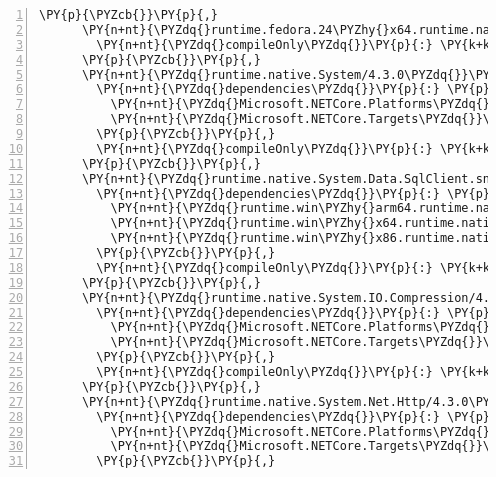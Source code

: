 \begin{Verbatim}[commandchars=\\\{\},numbers=left,firstnumber=1,stepnumber=1,numberblanklines=0]
      \PY{p}{\PYZcb{}}\PY{p}{,}
      \PY{n+nt}{\PYZdq{}runtime.fedora.24\PYZhy{}x64.runtime.native.System.Security.Cryptography.OpenSsl/4.3.0\PYZdq{}}\PY{p}{:} \PY{p}{\PYZob{}}
        \PY{n+nt}{\PYZdq{}compileOnly\PYZdq{}}\PY{p}{:} \PY{k+kc}{true}
      \PY{p}{\PYZcb{}}\PY{p}{,}
      \PY{n+nt}{\PYZdq{}runtime.native.System/4.3.0\PYZdq{}}\PY{p}{:} \PY{p}{\PYZob{}}
        \PY{n+nt}{\PYZdq{}dependencies\PYZdq{}}\PY{p}{:} \PY{p}{\PYZob{}}
          \PY{n+nt}{\PYZdq{}Microsoft.NETCore.Platforms\PYZdq{}}\PY{p}{:} \PY{l+s+s2}{\PYZdq{}2.1.0\PYZhy{}rc1\PYZdq{}}\PY{p}{,}
          \PY{n+nt}{\PYZdq{}Microsoft.NETCore.Targets\PYZdq{}}\PY{p}{:} \PY{l+s+s2}{\PYZdq{}2.1.0\PYZhy{}rc1\PYZdq{}}
        \PY{p}{\PYZcb{}}\PY{p}{,}
        \PY{n+nt}{\PYZdq{}compileOnly\PYZdq{}}\PY{p}{:} \PY{k+kc}{true}
      \PY{p}{\PYZcb{}}\PY{p}{,}
      \PY{n+nt}{\PYZdq{}runtime.native.System.Data.SqlClient.sni/4.4.0\PYZdq{}}\PY{p}{:} \PY{p}{\PYZob{}}
        \PY{n+nt}{\PYZdq{}dependencies\PYZdq{}}\PY{p}{:} \PY{p}{\PYZob{}}
          \PY{n+nt}{\PYZdq{}runtime.win\PYZhy{}arm64.runtime.native.System.Data.SqlClient.sni\PYZdq{}}\PY{p}{:} \PY{l+s+s2}{\PYZdq{}4.4.0\PYZdq{}}\PY{p}{,}
          \PY{n+nt}{\PYZdq{}runtime.win\PYZhy{}x64.runtime.native.System.Data.SqlClient.sni\PYZdq{}}\PY{p}{:} \PY{l+s+s2}{\PYZdq{}4.4.0\PYZdq{}}\PY{p}{,}
          \PY{n+nt}{\PYZdq{}runtime.win\PYZhy{}x86.runtime.native.System.Data.SqlClient.sni\PYZdq{}}\PY{p}{:} \PY{l+s+s2}{\PYZdq{}4.4.0\PYZdq{}}
        \PY{p}{\PYZcb{}}\PY{p}{,}
        \PY{n+nt}{\PYZdq{}compileOnly\PYZdq{}}\PY{p}{:} \PY{k+kc}{true}
      \PY{p}{\PYZcb{}}\PY{p}{,}
      \PY{n+nt}{\PYZdq{}runtime.native.System.IO.Compression/4.3.0\PYZdq{}}\PY{p}{:} \PY{p}{\PYZob{}}
        \PY{n+nt}{\PYZdq{}dependencies\PYZdq{}}\PY{p}{:} \PY{p}{\PYZob{}}
          \PY{n+nt}{\PYZdq{}Microsoft.NETCore.Platforms\PYZdq{}}\PY{p}{:} \PY{l+s+s2}{\PYZdq{}2.1.0\PYZhy{}rc1\PYZdq{}}\PY{p}{,}
          \PY{n+nt}{\PYZdq{}Microsoft.NETCore.Targets\PYZdq{}}\PY{p}{:} \PY{l+s+s2}{\PYZdq{}2.1.0\PYZhy{}rc1\PYZdq{}}
        \PY{p}{\PYZcb{}}\PY{p}{,}
        \PY{n+nt}{\PYZdq{}compileOnly\PYZdq{}}\PY{p}{:} \PY{k+kc}{true}
      \PY{p}{\PYZcb{}}\PY{p}{,}
      \PY{n+nt}{\PYZdq{}runtime.native.System.Net.Http/4.3.0\PYZdq{}}\PY{p}{:} \PY{p}{\PYZob{}}
        \PY{n+nt}{\PYZdq{}dependencies\PYZdq{}}\PY{p}{:} \PY{p}{\PYZob{}}
          \PY{n+nt}{\PYZdq{}Microsoft.NETCore.Platforms\PYZdq{}}\PY{p}{:} \PY{l+s+s2}{\PYZdq{}2.1.0\PYZhy{}rc1\PYZdq{}}\PY{p}{,}
          \PY{n+nt}{\PYZdq{}Microsoft.NETCore.Targets\PYZdq{}}\PY{p}{:} \PY{l+s+s2}{\PYZdq{}2.1.0\PYZhy{}rc1\PYZdq{}}
        \PY{p}{\PYZcb{}}\PY{p}{,}

\end{Verbatim}
